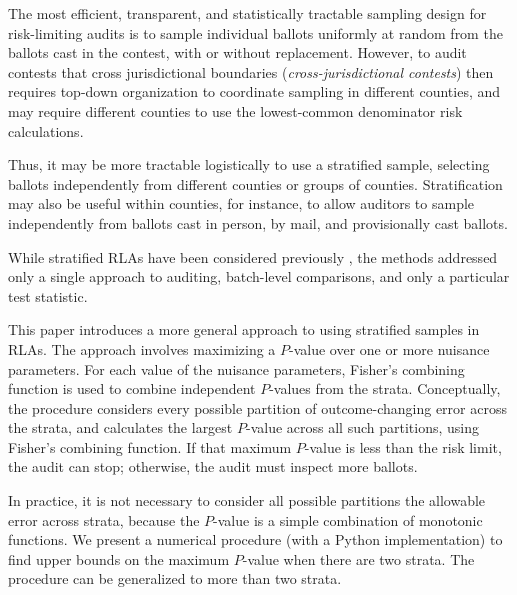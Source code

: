 \documentclass[runningheads]{llncs}
\newcommand{\comment}[1]{\textcolor{red}{\sc #1}}
\begin{document}

The most efficient, transparent, and statistically tractable sampling design for risk-limiting audits is to sample individual ballots uniformly at random from the ballots cast in the contest, with or without replacement.
However, to audit contests that cross jurisdictional boundaries (\emph{cross-jurisdictional contests}) then requires top-down organization to coordinate sampling in different counties, and may require different counties to use the lowest-common denominator risk calculations. 

Thus, it may be more tractable logistically to use a stratified sample, selecting ballots independently from different counties or groups of counties. 
Stratification may also be useful within counties, for instance, to allow auditors to sample independently from ballots cast in person, by mail, and provisionally cast ballots.

While stratified RLAs have been considered previously \cite{stark08a,higginsEtal11}, the methods addressed only a single approach to auditing, batch-level comparisons, and only a particular test statistic.

This paper introduces a more general approach to using stratified samples in RLAs.
The approach involves maximizing a $P$-value over one or more nuisance parameters.
For each value of the nuisance parameters, Fisher's combining function is used to combine independent $P$-values from the strata. 
Conceptually, the procedure considers every possible partition of outcome-changing error across the strata, and calculates the largest
$P$-value across all such partitions, using Fisher's combining function.
If that maximum $P$-value is less than the risk limit, the audit can stop;
otherwise, the audit must inspect more ballots.

In practice, it is not necessary to consider all possible partitions the allowable error across strata, because the $P$-value is a simple combination of monotonic functions.
We present a numerical procedure (with a Python implementation)
to find upper bounds on the maximum $P$-value when there are two strata.
The procedure can be generalized to more than two strata.
\end{document}
